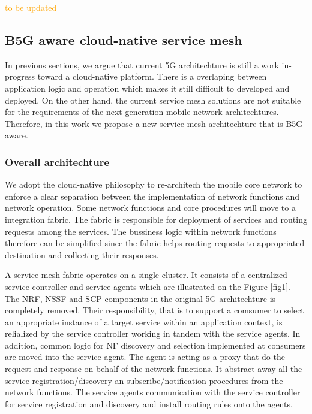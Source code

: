\documentclass[a4paper]{article}
\begin{document}
\textcolor{orange}{to be updated}
\subsection{B5G aware cloud-native service mesh}

In previous sections, we argue that current 5G architechture is still a work in-progress toward a cloud-native platform. There is a overlaping between application logic and operation which makes it still difficult to developed and deployed. On the other hand, the current service mesh solutions are not suitable for the requirements of the next generation mobile network architechtures. Therefore, in this work we propose a new service mesh architechture that is B5G aware. 



\subsubsection{Overall architechture}

We adopt the cloud-native philosophy to re-architech the mobile core network to enforce a clear separation between the implementation of network functions and network operation. Some network functions and core procedures will move to a integration fabric. The fabric is responsible for deployment of services and routing requests among the services. The bussiness logic within network functions therefore can be simplified since the fabric helps routing requests to appropriated destination and collecting their responses. 

A service mesh fabric operates on a single cluster. It consists of a centralized service controller and service agents which are illustrated on the Figure \ref{fig1}. The NRF, NSSF and SCP components in the original 5G architechture is completely removed. Their responsibility, that is to support a comsumer to select an appropriate instance of a target service within an application context, is relialized by the service controller working in tandem with the service agents. In addition, common logic for NF discovery and selection implemented at consumers are moved into the service agent. The agent is acting as a proxy that do the request and response on behalf of the network functions. It abstract away all the service registration/discovery an subscribe/notification procedures from the network functions. The service agents communication with the service controller for service registration and discovery and install routing rules onto the agents. 
\end{document}
